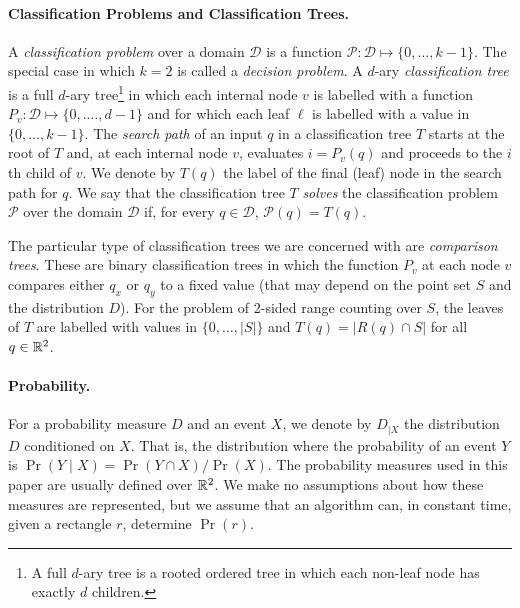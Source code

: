 \documentclass[charterfonts]{patmorin}
\begin{document}
\paragraph{Classification Problems and Classification Trees.}

A \emph{classification problem} over a domain $\mathcal{D}$ is a
function $\mathcal{P}:\mathcal{D}\mapsto \{0,\ldots,k-1\}$.  The
special case in which $k=2$ is called a \emph{decision problem}.  A
$d$-ary \emph{classification tree} is a full $d$-ary tree\footnote{A
full $d$-ary tree is a rooted ordered tree in which each non-leaf node
has exactly $d$ children.} in which each internal node $v$ is labelled
with a function $P_v:\mathcal{D}\mapsto\{0,.\ldots,d-1\}$ and for
which each leaf $\ell$ is labelled with a value
in $\{0,\ldots,k-1\}$. The \emph{search path} of an input $q$
in a classification tree $T$ starts at the root of $T$ and, at each
internal node $v$, evaluates $i=P_v(q)$ and proceeds to the $i$th
child of $v$.  We denote by $T(q)$ the label of the final (leaf) node
in the search path for $q$.  We say that the classification tree $T$
\emph{solves} the classification problem $\mathcal{P}$ over the domain
$\mathcal{D}$ if, for every $q\in \mathcal{D}$, $\mathcal{P}(q)=T(q)$.

The particular type of classification trees we are concerned with are
\emph{comparison trees}.  These are binary classification trees in
which the function $P_v$ at each node $v$ compares either $q_x$ or
$q_y$ to a fixed value (that may depend on the point set $S$ and the
distribution $D$).  For the problem of 2-sided range counting over
$S$, the leaves of $T$ are labelled with values in $\{0,\ldots,|S|\}$
and $T(q)=|R(q)\cap S|$ for all $q\in\mathbb{R}^2$.


\paragraph{Probability.}

For a probability measure $D$ and an event $X$, we denote by $D_{|X}$ the
distribution $D$ conditioned on $X$.  That is, the distribution where
the probability of an event $Y$ is $\Pr(Y\mid X)=\Pr(Y\cap X)/\Pr(X)$.
The probability measures used in this paper are usually defined over
$\mathbb{R}^2$.  We make no assumptions about how these measures are
represented, but we assume that an algorithm can, in constant time,
given a rectangle $r$, determine $\Pr(r)$.
\end{document}
